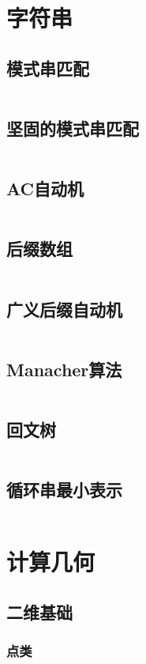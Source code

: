 \documentclass[a4paper,openany]{book}
\newcommand{\cppcode}[1]{
    \inputminted[mathescape,
    			 tabsize=4,
    			 linenos,
    			 frame=single,
    			 framesep=2mm,
    			 breakaftergroup=true,
    			 breakautoindent=true,
    			 breakbytoken=true,
    			 breaklines=true
    ]{cpp}{#1}
}
\begin{document}
\begin{spacing}{1.0}
	\chapter{字符串}
		\section{模式串匹配}
			\cppcode{Source/String-Algorithm/Knuth-Morris-Pratt.cpp}
		\section{坚固的模式串匹配}
			\cppcode{Source/String-Algorithm/Extended-Knuth-Morris-Pratt.cpp}
		\section{AC自动机}
			\cppcode{Source/String-Algorithm/Aho-Corasick-Automaton.cpp}
		\section{后缀数组}
			\cppcode{Source/String-Algorithm/Suffix-Array.cpp}
		\section{广义后缀自动机}
			\cppcode{Source/String-Algorithm/Generalized-Suffix-Automaton.cpp}
		\section{Manacher算法}
			\cppcode{Source/String-Algorithm/Manacher.cpp}
		\section{回文树}
			\cppcode{Source/String-Algorithm/Palindromic-Tree.cpp}
		\section{循环串最小表示}
			\cppcode{Source/String-Algorithm/Minimum-Circular-Representation.cpp}
	\chapter{计算几何}
		\section{二维基础}
			\subsection{点类}
				\cppcode{Source/Computational-Geometry/Point-Class-2D.cpp}

\end{spacing}
\end{document}
